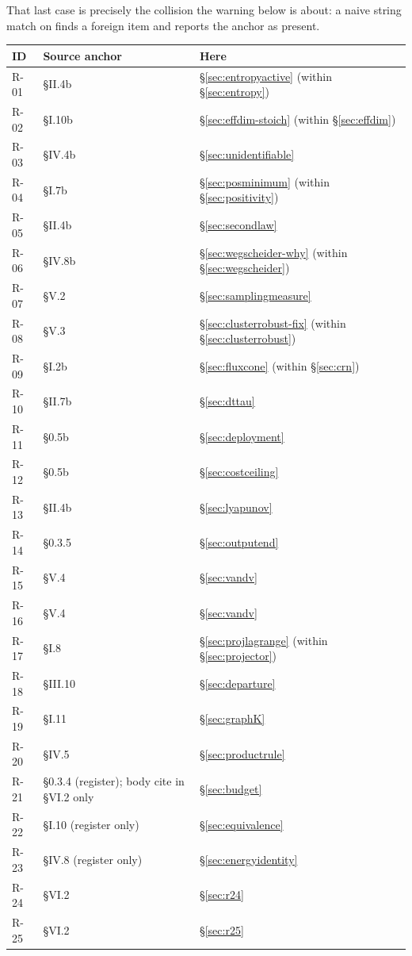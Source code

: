 That last case is precisely the collision the warning below is about: a naive
string match on  finds a foreign item and reports the anchor as
present.

\begin{center}
\begin{tabularx}{\textwidth}{@{}L{1.5cm} L{3.4cm} Y@{}}
\toprule
\textbf{ID} & \textbf{Source anchor} & \textbf{Here} \\
\midrule
R-01 & \S II.4b   & \S\ref{sec:entropyactive} (within \S\ref{sec:entropy}) \\
R-02 & \S I.10b   & \S\ref{sec:effdim-stoich} (within \S\ref{sec:effdim}) \\
R-03 & \S IV.4b   & \S\ref{sec:unidentifiable} \\
R-04 & \S I.7b    & \S\ref{sec:posminimum} (within \S\ref{sec:positivity}) \\
R-05 & \S II.4b   & \S\ref{sec:secondlaw} \\
R-06 & \S IV.8b   & \S\ref{sec:wegscheider-why} (within
                     \S\ref{sec:wegscheider}) \\
R-07 & \S V.2     & \S\ref{sec:samplingmeasure} \\
R-08 & \S V.3     & \S\ref{sec:clusterrobust-fix} (within
                     \S\ref{sec:clusterrobust}) \\
R-09 & \S I.2b    & \S\ref{sec:fluxcone} (within \S\ref{sec:crn}) \\
R-10 & \S II.7b   & \S\ref{sec:dttau} \\
R-11 & \S0.5b     & \S\ref{sec:deployment} \\
R-12 & \S0.5b     & \S\ref{sec:costceiling} \\
R-13 & \S II.4b   & \S\ref{sec:lyapunov} \\
R-14 & \S0.3.5    & \S\ref{sec:outputend} \\
R-15 & \S V.4     & \S\ref{sec:vandv} \\
R-16 & \S V.4     & \S\ref{sec:vandv} \\
R-17 & \S I.8     & \S\ref{sec:projlagrange} (within \S\ref{sec:projector}) \\
R-18 & \S III.10  & \S\ref{sec:departure} \\
R-19 & \S I.11    & \S\ref{sec:graphK} \\
R-20 & \S IV.5    & \S\ref{sec:productrule} \\
R-21 & \S0.3.4 (register); body cite in \S VI.2 only & \S\ref{sec:budget} \\
R-22 & \S I.10 (register only) & \S\ref{sec:equivalence} \\
R-23 & \S IV.8 (register only) & \S\ref{sec:energyidentity} \\
R-24 & \S VI.2    & \S\ref{sec:r24} \\
R-25 & \S VI.2    & \S\ref{sec:r25} \\
\bottomrule
\end{tabularx}
\end{center}

